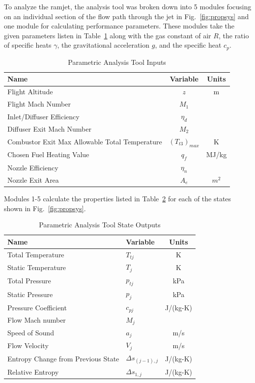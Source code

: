 \documentclass[conf]{new-aiaa} %
\begin{document}
To analyze the ramjet, the analysis tool was broken down into 5 modules focusing on an individual section of the flow path through the jet in Fig.~\ref{fig:propsys} and one module for calculating performance parameters. These modules take the given parameters listen in Table~\ref{tab:tool_inputs} along with the gas constant of air $R$, the ratio of specific heats $\gamma$, the gravitational acceleration $g$, and the specific heat $c_p$.

\begin{table}[hbt!] %
    \caption{\label{tab:tool_inputs} Parametric Analysis Tool Inputs}
    \centering
    \begin{tabular}{lcc}
        \hline
        Name& Variable& Units\\\hline
        Flight Altitude& $z$& m\\
        Flight Mach Number& $M_1$\\
        Inlet/Diffuser Efficiency& $\eta_d$\\
        Diffuser Exit Mach Number& $M_2$\\
        Combustor Exit Max Allowable Total Temperature& $(T_{t3})_{max}$& K\\
        Chosen Fuel Heating Value& $q_f$& MJ/kg\\
        Nozzle Efficiency& $\eta_n$\\
        Nozzle Exit Area& $A_e$& $m^2$\\
        \hline
    \end{tabular}
\end{table}

Modules 1-5 calculate the properties listed in Table~\ref{tab:state_outputs} for each of the states shown in Fig.~\ref{fig:propsys}.

\begin{table}[hbt!] %
    \caption{\label{tab:state_outputs} Parametric Analysis Tool State Outputs}
    \centering
    \begin{tabular}{llc}
        \hline
        Name& Variable& Units\\\hline
        Total Temperature& $T_{tj}$& K\\
        Static Temperature& $T_{j}$& K\\
        Total Pressure& $p_{tj}$& kPa\\
        Static Pressure& $p_j$& kPa\\
        Pressure Coefficient& $c_{pj}$& J/(kg-K)\\
        Flow Mach number& $M_j$\\
        Speed of Sound& $a_j$& m/s\\
        Flow Velocity& $V_j$& m/s\\
        Entropy Change from Previous State& $\Delta s_{(j-1),j}$& J/(kg-K)\\
        Relative Entropy& $\Delta s_{1,j}$& J/(kg-K)\\
        \hline
    \end{tabular}
\end{table}
\end{document}
